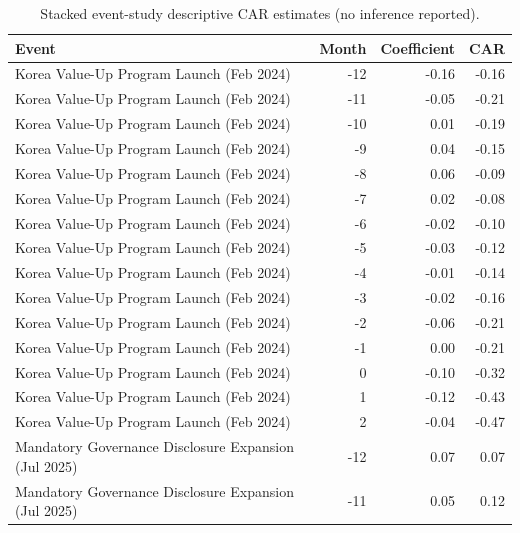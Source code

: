 \begin{table}
\caption{Stacked event-study descriptive CAR estimates (no inference reported).}
\label{tab:event_study_coefs}
\begin{tabular}{lrrr}
\toprule
Event & Month & Coefficient & CAR \\
\midrule
Korea Value-Up Program Launch (Feb 2024) & -12 & -0.16 & -0.16 \\
Korea Value-Up Program Launch (Feb 2024) & -11 & -0.05 & -0.21 \\
Korea Value-Up Program Launch (Feb 2024) & -10 & 0.01 & -0.19 \\
Korea Value-Up Program Launch (Feb 2024) & -9 & 0.04 & -0.15 \\
Korea Value-Up Program Launch (Feb 2024) & -8 & 0.06 & -0.09 \\
Korea Value-Up Program Launch (Feb 2024) & -7 & 0.02 & -0.08 \\
Korea Value-Up Program Launch (Feb 2024) & -6 & -0.02 & -0.10 \\
Korea Value-Up Program Launch (Feb 2024) & -5 & -0.03 & -0.12 \\
Korea Value-Up Program Launch (Feb 2024) & -4 & -0.01 & -0.14 \\
Korea Value-Up Program Launch (Feb 2024) & -3 & -0.02 & -0.16 \\
Korea Value-Up Program Launch (Feb 2024) & -2 & -0.06 & -0.21 \\
Korea Value-Up Program Launch (Feb 2024) & -1 & 0.00 & -0.21 \\
Korea Value-Up Program Launch (Feb 2024) & 0 & -0.10 & -0.32 \\
Korea Value-Up Program Launch (Feb 2024) & 1 & -0.12 & -0.43 \\
Korea Value-Up Program Launch (Feb 2024) & 2 & -0.04 & -0.47 \\
Mandatory Governance Disclosure Expansion (Jul 2025) & -12 & 0.07 & 0.07 \\
Mandatory Governance Disclosure Expansion (Jul 2025) & -11 & 0.05 & 0.12 \\

\end{tabular}
\end{table}
